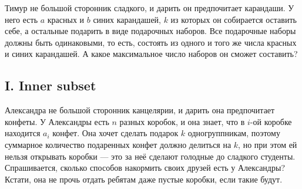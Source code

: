 Тимур не большой сторонник сладкого, и дарить он предпочитает карандаши. У него есть $a$ красных и $b$ синих карандашей, $k$ из которых он собирается оставить себе, а остальные подарить в виде подарочных наборов. Все подарочные наборы должны быть одинаковыми, то есть, состоять из одного и того же числа красных и синих карандашей. А какое максимальное число наборов он сможет составить?







\subsection*{I. Inner subset}

Александра не большой сторонник канцелярии, и дарить она предпочитает конфеты. У Александры есть $n$ разных коробок, и она знает, что в $i$-ой коробке находится $a_i$ конфет. Она хочет сделать подарок $k$ одногруппникам, поэтому суммарное количество подаренных конфет должно делиться на $k$, но при этом ей нельзя открывать коробки --- это за неё сделают голодные до сладкого студенты. Спрашивается, сколько способов накормить своих друзей есть у Александры? Кстати, она не прочь отдать ребятам даже пустые коробки, если такие будут.




